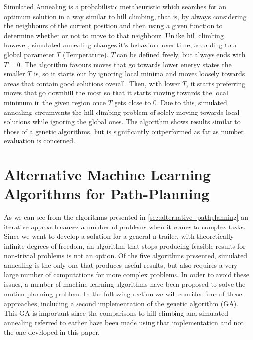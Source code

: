 Simulated Annealing is a probabilistic metaheuristic which searches for an optimum solution in a way similar to hill climbing, that is, by always considering the neighbours of the current position and then using a given function to determine whether or not to move to that neighbour. Unlike hill climbing however, simulated annealing changes it's behaviour over time, according to a global parameter $T$ (Temperature). $T$ can be defined freely, but always ends with $T=0$. The algorithm favours moves that go towards lower energy states the smaller $T$ is, so it starts out by ignoring local minima and moves loosely towards areas that contain good solutions overall. Then, with lower $T$, it starts preferring moves that go downhill the most so that it starts moving towards the local minimum in the given region once $T$ gets close to $0$. Due to this, simulated annealing circumvents the hill climbing problem of solely moving towards local solutions while ignoring the global ones. The algorithm shows results similar to those of a genetic algorithms, but is significantly outperformed as far as number evaluation is concerned.\cite{8}


\section{Alternative Machine Learning Algorithms for Path-Planning}
\label{sec:alternative_machine_learning_pathplanning}

As we can see from the algorithms presented in \ref{sec:alternative_pathplanning} an iterative approach causes a number of problems when it comes to complex tasks. Since we want to develop a solution for a general-n-trailer, with theoretically infinite degrees of freedom, an algorithm that stops producing feasible results for non-trivial problems is not an option. Of the five algorithms presented, simulated annealing is the only one that produces useful results, but also requires a very large number of computations \cite{8} for more complex problems. In order to avoid these issues, a number of machine learning algorithms have been proposed to solve the motion planning problem. In the following section we will consider four of these approaches, including a second implementation of the genetic algorithm (GA). This GA is important since the comparisons to hill climbing and simulated annealing referred to earlier have been made using that implementation and not the one developed in this paper. \cite{8}


